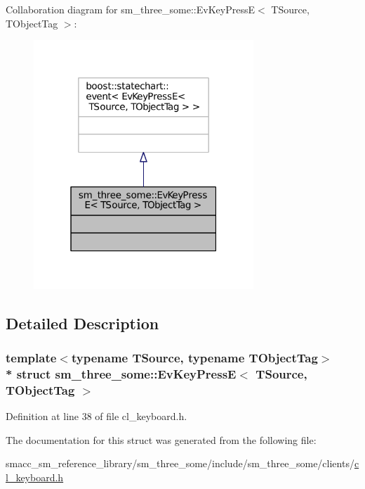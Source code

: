 Collaboration diagram for sm\+\_\+three\+\_\+some\+:\+:Ev\+Key\+PressE$<$ T\+Source, T\+Object\+Tag $>$\+:
\nopagebreak
\begin{figure}[H]
\begin{center}
\leavevmode
\includegraphics[width=235pt]{structsm__three__some_1_1EvKeyPressE__coll__graph}
\end{center}
\end{figure}


\subsection{Detailed Description}
\subsubsection*{template$<$typename T\+Source, typename T\+Object\+Tag$>$\\*
struct sm\+\_\+three\+\_\+some\+::\+Ev\+Key\+Press\+E$<$ T\+Source, T\+Object\+Tag $>$}



Definition at line 38 of file cl\+\_\+keyboard.\+h.



The documentation for this struct was generated from the following file\+:\begin{DoxyCompactItemize}
\item 
smacc\+\_\+sm\+\_\+reference\+\_\+library/sm\+\_\+three\+\_\+some/include/sm\+\_\+three\+\_\+some/clients/\hyperlink{cl__keyboard_8h}{cl\+\_\+keyboard.\+h}\end{DoxyCompactItemize}
